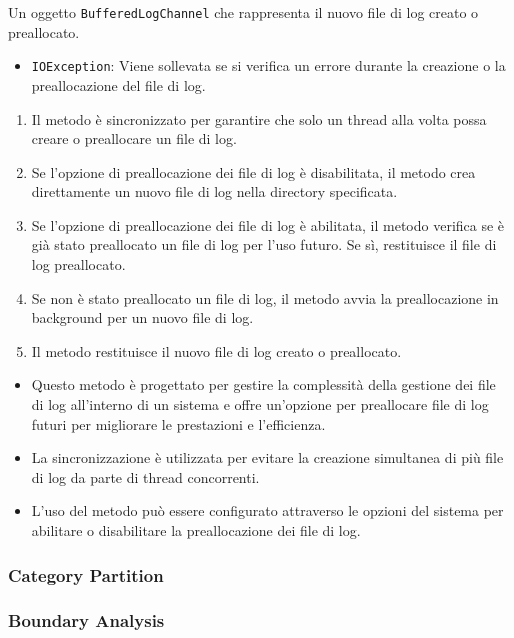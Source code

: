 \documentclass[12pt, a4paper]{article}
\begin{document}
Un oggetto \texttt{BufferedLogChannel} che rappresenta il nuovo file di log creato o preallocato.

\begin{itemize}
    \item \texttt{IOException}: Viene sollevata se si verifica un errore durante la creazione o la preallocazione del file di log.
\end{itemize}

\begin{enumerate}
    \item Il metodo è sincronizzato per garantire che solo un thread alla volta possa creare o preallocare un file di log.
    \item Se l'opzione di preallocazione dei file di log è disabilitata, il metodo crea direttamente un nuovo file di log nella directory specificata.
    \item Se l'opzione di preallocazione dei file di log è abilitata, il metodo verifica se è già stato preallocato un file di log per l'uso futuro. Se sì, restituisce il file di log preallocato.
    \item Se non è stato preallocato un file di log, il metodo avvia la preallocazione in background per un nuovo file di log.
    \item Il metodo restituisce il nuovo file di log creato o preallocato.
\end{enumerate}

\begin{itemize}
    \item Questo metodo è progettato per gestire la complessità della gestione dei file di log all'interno di un sistema e offre un'opzione per preallocare file di log futuri per migliorare le prestazioni e l'efficienza.
    \item La sincronizzazione è utilizzata per evitare la creazione simultanea di più file di log da parte di thread concorrenti.
    \item L'uso del metodo può essere configurato attraverso le opzioni del sistema per abilitare o disabilitare la preallocazione dei file di log.
\end{itemize}

\subsubsection{Category Partition}

\subsubsection{Boundary Analysis}
\end{document}
